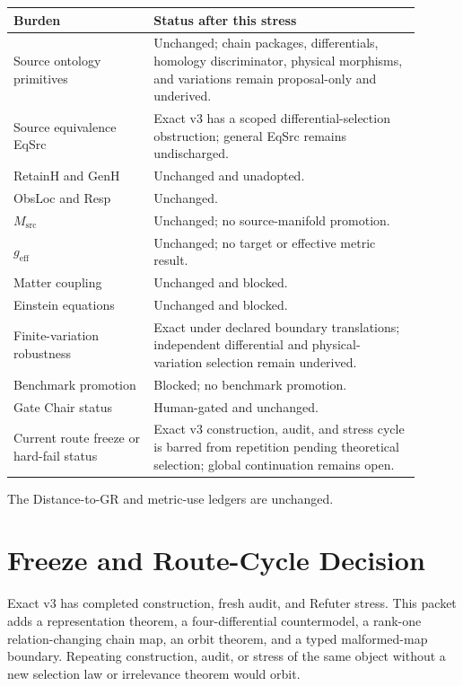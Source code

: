 \documentclass[11pt]{article}
\begin{document}
\begin{longtable}{p{0.31\linewidth}p{0.59\linewidth}}
\toprule
Burden & Status after this stress\\
\midrule
Source ontology primitives & Unchanged; chain packages, differentials, homology discriminator, physical morphisms, and variations remain proposal-only and underived.\\
Source equivalence EqSrc & Exact v3 has a scoped differential-selection obstruction; general EqSrc remains undischarged.\\
RetainH and GenH & Unchanged and unadopted.\\
ObsLoc and Resp & Unchanged.\\
\(M_{\mathrm{src}}\) & Unchanged; no source-manifold promotion.\\
\(g_{\mathrm{eff}}\) & Unchanged; no target or effective metric result.\\
Matter coupling & Unchanged and blocked.\\
Einstein equations & Unchanged and blocked.\\
Finite-variation robustness & Exact under declared boundary translations; independent differential and physical-variation selection remain underived.\\
Benchmark promotion & Blocked; no benchmark promotion.\\
Gate Chair status & Human-gated and unchanged.\\
Current route freeze or hard-fail status & Exact v3 construction, audit, and stress cycle is barred from repetition pending theoretical selection; global continuation remains open.\\
\bottomrule
\end{longtable}

The Distance-to-GR and metric-use ledgers are unchanged.

\section{Freeze and Route-Cycle Decision}

Exact v3 has completed construction, fresh audit, and Refuter stress. This
packet adds a representation theorem, a four-differential countermodel, a
rank-one relation-changing chain map, an orbit theorem, and a typed
malformed-map boundary. Repeating construction, audit, or stress of the same
object without a new selection law or irrelevance theorem would orbit.
\end{document}
